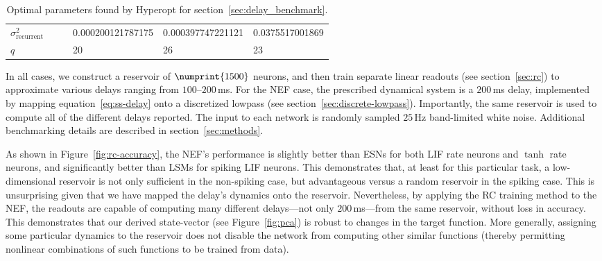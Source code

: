 \begin{table}
\begin{tabularx}{\textwidth}{YYYYYY}
$\sigma^2_\mathrm{recurrent}$ &  &  & \num[round-precision=3,round-mode=figures,scientific-notation=true]{0.000200121787175} & \num[round-precision=3,round-mode=figures,scientific-notation=true]{0.000397747221121} & \num[round-precision=3,round-mode=figures,scientific-notation=true]{0.0375517001869} \\

$q$ &  &  & 20 & 26 & 23 \\

    \bottomrule
  \end{tabularx}
  
  \caption{ \label{tab:hyperopt}
    Optimal parameters found by Hyperopt for section~\ref{sec:delay_benchmark}.
  }
\end{table}

In all cases, we construct a reservoir of $\numprint{1500}$ neurons, and then train separate linear readouts (see section~\ref{sec:rc}) to approximate various delays ranging from $100$--$200$\,ms.
For the NEF case, the prescribed dynamical system is a $200$\,ms delay, implemented by mapping equation~\ref{eq:ss-delay} onto a discretized lowpass (see section~\ref{sec:discrete-lowpass}).
Importantly, the same reservoir is used to compute all of the different delays reported.
The input to each network is randomly sampled $25$\,Hz band-limited white noise.
Additional benchmarking details are described in section~\ref{sec:methods}.

As shown in Figure~\ref{fig:rc-accuracy}, the NEF's performance is slightly better than ESNs for both LIF rate neurons and $\tanh$ rate neurons, and significantly better than LSMs for spiking LIF neurons.
This demonstrates that, at least for this particular task, a low-dimensional reservoir is not only sufficient in the non-spiking case, but advantageous versus a random reservoir in the spiking case.
This is unsurprising given that we have mapped the delay's dynamics onto the reservoir.
Nevertheless, by applying the RC training method to the NEF, the readouts are capable of computing many different delays---not only $200$\,ms---from the same reservoir, without loss in accuracy.
This demonstrates that our derived state-vector (see Figure~\ref{fig:pca}) is robust to changes in the target function.
More generally, assigning some particular dynamics to the reservoir does not disable the network from computing other similar functions (thereby permitting nonlinear combinations of such functions to be trained from data).


